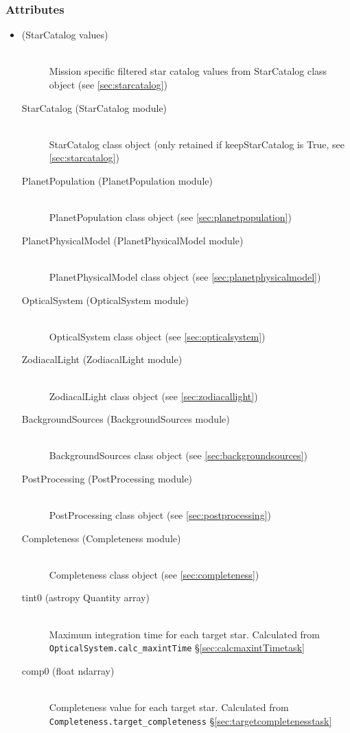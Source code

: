\documentclass[cleanfoot]{asme2ej}
\begin{document}
\subsubsection*{Attributes}
\begin{itemize}
\item 
\begin{description}
    \item[(StarCatalog values)] \hfill \\ Mission specific filtered star catalog values from StarCatalog class object (see \ref{sec:starcatalog})
    \item[StarCatalog (StarCatalog module)]\hfill \\ StarCatalog class object (only retained if keepStarCatalog is True, see \ref{sec:starcatalog})
    \item[PlanetPopulation (PlanetPopulation module)] \hfill \\ PlanetPopulation class object (see \ref{sec:planetpopulation})
    \item[PlanetPhysicalModel (PlanetPhysicalModel module)] \hfill \\ PlanetPhysicalModel class object (see \ref{sec:planetphysicalmodel})
    \item[OpticalSystem (OpticalSystem module)] \hfill \\ OpticalSystem class object (see \ref{sec:opticalsystem})
    \item[ZodiacalLight (ZodiacalLight module)] \hfill \\ ZodiacalLight class object (see \ref{sec:zodiacallight})
    \item[BackgroundSources (BackgroundSources module)] \hfill \\ BackgroundSources class object (see \ref{sec:backgroundsources})
    \item[PostProcessing (PostProcessing module)] \hfill \\ PostProcessing class object (see \ref{sec:postprocessing})
    \item[Completeness (Completeness module)] \hfill \\ Completeness class object (see \ref{sec:completeness})
    \item[tint0 (astropy Quantity array)] \hfill \\ Maximum integration time for each target star. Calculated from \verb+OpticalSystem.calc_maxintTime+ \S\ref{sec:calcmaxintTimetask}
    \item[comp0 (float ndarray)] \hfill \\ Completeness value for each target star. Calculated from \verb+Completeness.target_completeness+ \S\ref{sec:targetcompletenesstask}

\end{description}
\end{itemize}
\end{document}
